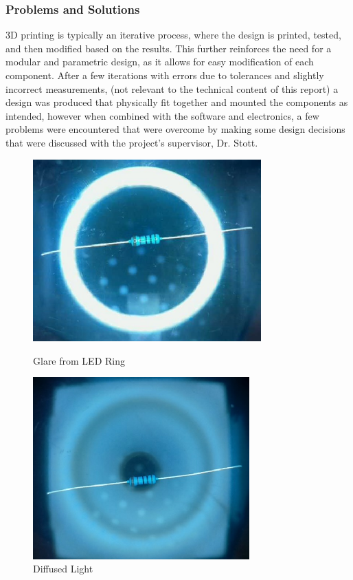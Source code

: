 \subsubsection{Problems and Solutions}
3D printing is typically an iterative process, where the design is printed, tested, and then modified based on the results.
This further reinforces the need for a modular and parametric design, as it allows for easy modification of each component.
After a few iterations with errors due to tolerances and slightly incorrect measurements, (not relevant to the technical content of this report)
a design was produced that physically fit together and mounted the components as intended, however when combined with the software
and electronics, a few problems were encountered that were overcome by making some design decisions that were discussed with the project's supervisor, Dr. Stott. \\

\begin{figure}
    \begin{minipage}[t]{0.49\textwidth}
        \centering
        \includegraphics[width=\textwidth,height=7cm, keepaspectratio]{imgs/design/ringlight.jpg}
        \caption{Glare from LED Ring}
        \label{fig:glare}
    \end{minipage}
    \hfill
    \begin{minipage}[t]{0.49\textwidth}
        \centering
        \includegraphics[width=\textwidth,height=7cm, keepaspectratio]{imgs/design/diffusedlight.jpg}
        \caption{Diffused Light}
        \label{fig:diffusedlight}
    \end{minipage}
\end{figure}

